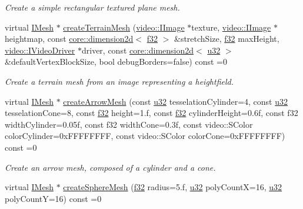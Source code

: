 \begin{DoxyCompactItemize}
\begin{DoxyCompactList}\small\item\em Create a simple rectangular textured plane mesh. \end{DoxyCompactList}\item 
virtual \hyperlink{classirr_1_1scene_1_1IMesh}{I\+Mesh} $\ast$ \hyperlink{classirr_1_1scene_1_1IGeometryCreator_a7cf8a80a7d76d91ab9a2a1d5f63d4eea}{create\+Terrain\+Mesh} (\hyperlink{classirr_1_1video_1_1IImage}{video\+::\+I\+Image} $\ast$texture, \hyperlink{classirr_1_1video_1_1IImage}{video\+::\+I\+Image} $\ast$heightmap, const \hyperlink{classirr_1_1core_1_1dimension2d}{core\+::dimension2d}$<$ \hyperlink{namespaceirr_a0277be98d67dc26ff93b1a6a1d086b07}{f32} $>$ \&stretch\+Size, \hyperlink{namespaceirr_a0277be98d67dc26ff93b1a6a1d086b07}{f32} max\+Height, \hyperlink{classirr_1_1video_1_1IVideoDriver}{video\+::\+I\+Video\+Driver} $\ast$driver, const \hyperlink{classirr_1_1core_1_1dimension2d}{core\+::dimension2d}$<$ \hyperlink{namespaceirr_a0416a53257075833e7002efd0a18e804}{u32} $>$ \&default\+Vertex\+Block\+Size, bool debug\+Borders=false) const =0
\begin{DoxyCompactList}\small\item\em Create a terrain mesh from an image representing a heightfield. \end{DoxyCompactList}\item 
virtual \hyperlink{classirr_1_1scene_1_1IMesh}{I\+Mesh} $\ast$ \hyperlink{classirr_1_1scene_1_1IGeometryCreator_aba5b1b9a614c211eeb7a9f88d8e3ec50}{create\+Arrow\+Mesh} (const \hyperlink{namespaceirr_a0416a53257075833e7002efd0a18e804}{u32} tesselation\+Cylinder=4, const \hyperlink{namespaceirr_a0416a53257075833e7002efd0a18e804}{u32} tesselation\+Cone=8, const \hyperlink{namespaceirr_a0277be98d67dc26ff93b1a6a1d086b07}{f32} height=1.f, const \hyperlink{namespaceirr_a0277be98d67dc26ff93b1a6a1d086b07}{f32} cylinder\+Height=0.\+6f, const f32 width\+Cylinder=0.\+05f, const f32 width\+Cone=0.\+3f, const video\+::\+S\+Color color\+Cylinder=0x\+F\+F\+F\+F\+F\+F\+F\+F, const video\+::\+S\+Color color\+Cone=0x\+F\+F\+F\+F\+F\+F\+F\+F) const =0
\begin{DoxyCompactList}\small\item\em Create an arrow mesh, composed of a cylinder and a cone. \end{DoxyCompactList}\item 
virtual \hyperlink{classirr_1_1scene_1_1IMesh}{I\+Mesh} $\ast$ \hyperlink{classirr_1_1scene_1_1IGeometryCreator_ab97eb5f80cc08b4611cd56a968a98521}{create\+Sphere\+Mesh} (\hyperlink{namespaceirr_a0277be98d67dc26ff93b1a6a1d086b07}{f32} radius=5.f, \hyperlink{namespaceirr_a0416a53257075833e7002efd0a18e804}{u32} poly\+CountX=16, \hyperlink{namespaceirr_a0416a53257075833e7002efd0a18e804}{u32} poly\+CountY=16) const =0

\end{DoxyCompactItemize}
